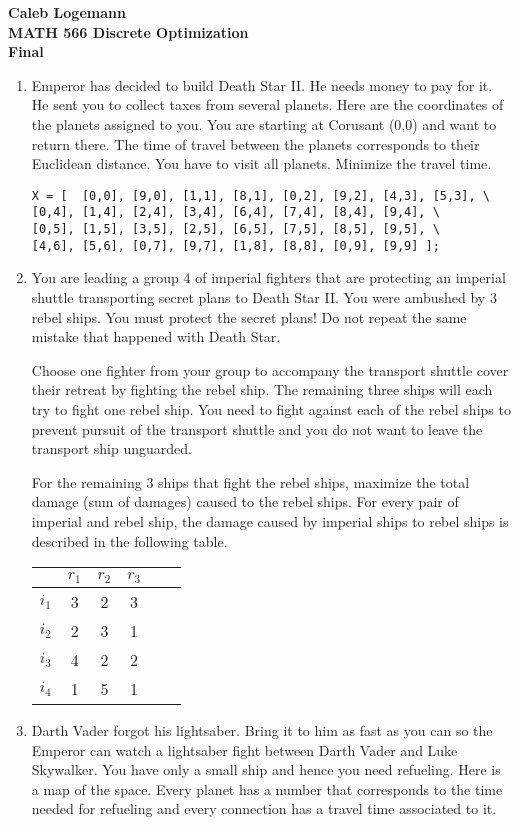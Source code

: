 \documentclass[11pt, oneside]{article}
\begin{document}
\noindent \textbf{\Large{Caleb Logemann \\
MATH 566 Discrete Optimization\\
Final
}}

%
\begin{enumerate}
  \item %
Emperor has decided to build Death Star II. He needs  money to pay for it. He sent you to collect taxes from
several planets. Here are the coordinates of the planets assigned to you. You are starting at Corusant (0,0) and want to
return there. The time of travel between the planets corresponds to their Euclidean distance.
You have to visit all planets. Minimize the travel time.
\begin{verbatim}
X = [  [0,0], [9,0], [1,1], [8,1], [0,2], [9,2], [4,3], [5,3], \
[0,4], [1,4], [2,4], [3,4], [6,4], [7,4], [8,4], [9,4], \
[0,5], [1,5], [3,5], [2,5], [6,5], [7,5], [8,5], [9,5], \
[4,6], [5,6], [0,7], [9,7], [1,8], [8,8], [0,9], [9,9] ];
\end{verbatim}
  \item %
    You are leading a group $4$ of imperial fighters that are protecting an
    imperial shuttle transporting secret plans to Death Star II. 
    You were ambushed by $3$ rebel ships. You must protect the secret plans! Do not repeat the same mistake that happened with Death Star.

    Choose one fighter from your group to accompany the transport shuttle cover their retreat by fighting the rebel ship.
    The remaining three ships will each try to fight one rebel ship. You need to fight against each of the rebel ships to prevent
    pursuit of the transport shuttle and you do not want to leave the transport ship unguarded.

    For the remaining 3 ships that fight the rebel ships, maximize the total damage (sum of damages) caused to the rebel ships.
    For every pair of imperial and rebel ship, the damage caused by imperial ships to rebel ships is described in the following table.
    \begin{center}
      \begin{tabular}{c|ccccc}
              & $r_1$ & $r_2$ & $r_3$ \\ \hline
        $i_1$ &    3  &     2 &     3 \\
        $i_2$ &    2  &     3 &     1 \\
        $i_3$ &    4  &     2 &     2 \\
        $i_4$ &    1  &     5 &     1 \\
      \end{tabular}
    \end{center}
  \item %
    Darth Vader forgot his lightsaber.
    Bring it to him as fast as you can so the Emperor can watch a lightsaber
    fight between Darth Vader and Luke Skywalker.
    You have only a small ship and hence you need refueling.
    Here is a map of the space.
    Every planet has a number that corresponds to the time needed for refueling 
    and every connection has a travel time associated to it. 


\end{enumerate}
\end{document}
